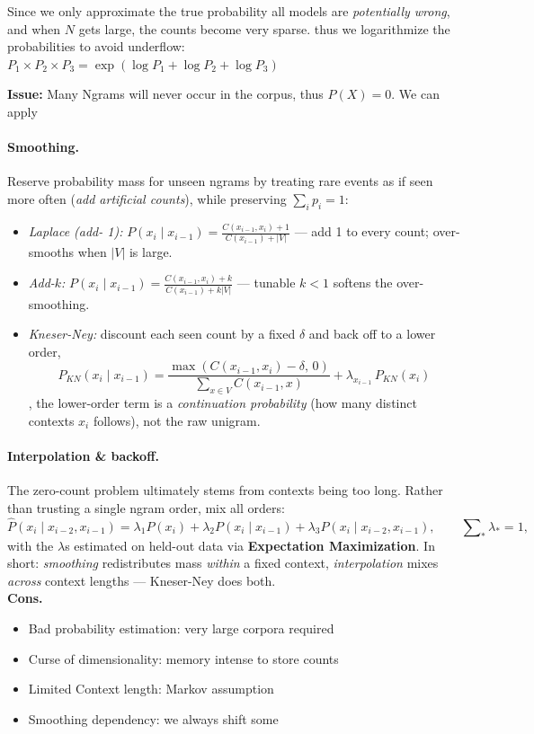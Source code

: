 \documentclass{article}
\begin{document}
Since we only approximate the true probability all models are \textit{potentially wrong}, and when $N$ gets large, the counts become very sparse. thus we logarithmize the probabilities to avoid underflow: $P_1 \times P_2 \times P_3 = \exp(\log P_1 + \log P_2 +\log P_3)$

\textbf{Issue:} Many Ngrams will never occur in the corpus, thus $P(X)=0$. We can apply 

\paragraph{Smoothing.} Reserve probability mass for unseen ngrams by treating rare events as if seen more often (\textit{add artificial counts}), while preserving $\sum_i p_i = 1$:
\begin{itemize}
  \item \textit{Laplace (add- 1):} $P(x_i \mid x_{i-1}) = \frac{C(x_{i-1},x_i)+1}{C(x_{i-1})+|V|}$ --- add 1 to every count; over-smooths when $|V|$ is large.
  \item \textit{Add-$k$:} $P(x_i \mid x_{i-1}) = \frac{C(x_{i-1},x_i)+k}{C(x_{i-1})+k|V|}$ --- tunable $k<1$ softens the over-smoothing.
  \item \textit{Kneser-Ney:} discount each seen count by a fixed $\delta$ and back off to a lower order, 
  $$P_{KN}(x_i \mid x_{i-1}) = \frac{\max(C(x_{i-1},x_i)-\delta,\,0)}{\sum_{x\in V}C(x_{i-1},x)} + \lambda_{x_{i-1}}\,P_{KN}(x_i)$$
  , the lower-order term is a \textit{continuation probability} (how many distinct contexts $x_i$ follows), not the raw unigram.
\end{itemize}

\paragraph{Interpolation \& backoff.} The zero-count problem ultimately stems from contexts being too long. Rather than trusting a single ngram order, mix all orders:
$$
\hat{P}(x_i \mid x_{i-2}, x_{i-1}) = \lambda_1 P(x_i) + \lambda_2 P(x_i \mid x_{i-1}) + \lambda_3 P(x_i \mid x_{i-2}, x_{i-1}), \qquad \sum\nolimits_* \lambda_* = 1,
$$
with the $\lambda$s estimated on held-out data via \textbf{Expectation Maximization}. In short: \textit{smoothing} redistributes mass \emph{within} a fixed context, \textit{interpolation} mixes \emph{across} context lengths --- Kneser-Ney does both.\\

\textbf{Cons.}
\begin{itemize}
    \item Bad probability estimation: very large corpora required
    \item Curse of dimensionality: memory intense to store counts
    \item Limited Context length: Markov assumption
    \item Smoothing dependency: we always shift some
\end{itemize}
\end{document}
